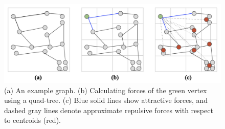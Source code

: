 \documentclass{vgtc}
\begin{document}

\begin{figure}[!t]
    \centering
    \includegraphics[width=\linewidth]{figures/quadtreeexampleu.png}
    \vspace{-0.7cm}
    \caption{(a) An example graph. (b) Calculating forces of the green vertex using a quad-tree. (c) Blue solid lines show attractive forces, and dashed gray lines denote approximate repulsive forces with respect to centroids (red).}
    \vspace{-0.3cm}
    \label{fig:quadtree}
\end{figure}
\end{document}
